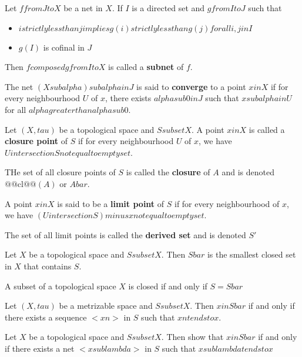 \begin{defn}
    Let $f from J to X$ be a net in $X$. If $I$ is a directed set and $g from I to J$ such that 
    \begin{itemize}
        \item $i strictly less than j implies g(i) strictly less than g(j) for all i, j in I$
        \item $g(I)$ is cofinal in $J$
    \end{itemize}
    Then $f composed g from I to X$ is called a \textbf{subnet} of $f$.
\end{defn}

\begin{defn}
    The net $(X sub alpha) sub {alpha in J}$ is said to \textbf{converge} to a point $x in X$ if for every neighbourhood $U$ of $x$, there exists $alpha sub 0 in J$ such that $x sub alpha in U$ for all $alpha greater than alpha sub 0$.
\end{defn}

\begin{defn}
    Let $(X, tau)$ be a topological space and $S subset X$. A point $x in X$ is called a \textbf{closure point} of $S$ if for every neighbourhood $U$ of $x$, we have $U intersection S not equal to empty set$.

    THe set of all closure points of $S$ is called the \textbf{closure} of $A$ and is denoted $@@\text{cl}@@(A)$ or $A bar$.
\end{defn}

\begin{defn}
    A point $x in X$ is said to be a \textbf{limit point} of $S$ if for every neighbourhood of $x$, we have $(U intersection S) minus {{ x }} not equal to empty set $.

    The set of all limit points is called the \textbf{derived set} and is denoted $S'$
\end{defn}

\begin{thm}
    Let $X$ be a topological space and $S subset X$. Then $S bar$ is the smallest closed set in $X$ that contains $S$.
\end{thm}

\begin{prop}
    A subset of a topological space $X$ is closed if and only if $S = S bar$
\end{prop}

\begin{thm}
    Let $(X, tau)$ be a metrizable space and $S subset X$. Then $x in S bar$ if and only if there exists a sequence $<xn>$ in $S$ such that $xn tends to x$.
\end{thm}

\begin{thm}
    Let $X$ be a topological space and $S subset X$. Then show that $x in S bar$ if and only if there exists a net $< x sub lambda >$ in $S$ such that $ x sub lambda tends to x$
\end{thm}
